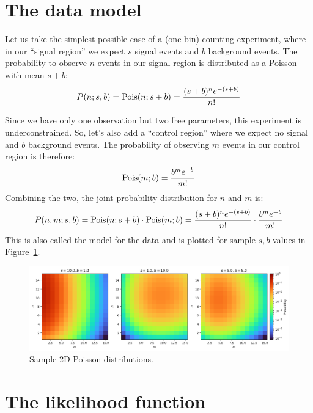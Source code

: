 \section{The data model}
\label{sec:data_model}

Let us take the simplest possible case of a (one bin) counting experiment, where in our ``signal region'' we expect $s$ signal events and $b$ background events.
The probability to observe $n$ events in our signal region is distributed as a Poisson with mean $s+b$:
\begin{equation}
\label{eq:poisson}
P(n; s, b) = \mathrm{Pois}(n; s+b) = \frac{(s+b)^n e^{-(s+b)}}{n!}
\end{equation}

Since we have only one observation but two free parameters, this experiment is underconstrained.
So, let's also add a ``control region'' where we expect no signal and $b$ background events.
The probability of observing $m$ events in our control region is therefore:
\begin{equation}
\label{eq:pois2}
\mathrm{Pois}(m; b) = \frac{b^m e^{-b}}{m!}
\end{equation}
Combining the two, the joint probability distribution for $n$ and $m$ is:
\begin{equation}
\label{eq:pois3}
P(n, m; s, b) = \mathrm{Pois}(n; s+b) \cdot \mathrm{Pois}(m; b) = \frac{(s+b)^n e^{-(s+b)}}{n!} \cdot \frac{b^m e^{-b}}{m!}
\end{equation}
This is also called the model for the data and is plotted for sample $s, b$ values in Figure~\ref{fig:pois}.

\begin{figure}[htb]
    \centering
    \captionsetup{justification=centering}
    \includegraphics[width=\textwidth]{figures/01-intro/1.png}
    \caption{Sample 2D Poisson distributions.}
    \label{fig:pois}
\end{figure}

\section{The likelihood function}

